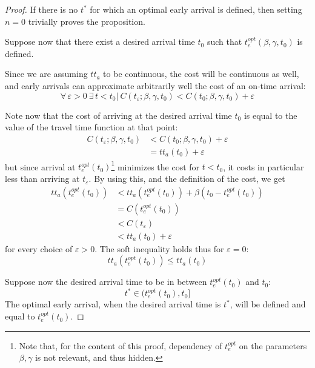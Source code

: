 \begin{proof}
  If there is no \(t^*\) for which an optimal early arrival is defined,
  then setting \(n = 0\) trivially proves the proposition.

  Suppose now that there exist a desired arrival time \(t_0\) such that \(t_e^{opt}(\beta, \gamma, t_0)\) is defined.

  Since we are assuming \(tt_a\) to be continuous,
  the cost will be continuous as well,
  and early arrivals can approximate arbitrarily well the cost of an on-time arrival:
  \begin{equation*}
    \forall\, \varepsilon > 0\ \exists\, t < t_0 |\ C(t_\varepsilon; \beta, \gamma, t_0) < C(t_0; \beta, \gamma, t_0) + \varepsilon
  \end{equation*}

  Note now that the cost of arriving at the desired arrival time \(t_0\) is equal to the value of the travel time function at that point:
  \begin{align*}
     C(t_\varepsilon; \beta, \gamma, t_0) & < C(t_0; \beta, \gamma, t_0) + \varepsilon \\
                              & = tt_a(t_0) + \varepsilon
  \end{align*}
  but since arrival at \(t_e^{opt}(t_0)\)\footnote{Note that, for the content of this proof, dependency of \(t_e^{opt}\) on the parameters \(\beta, \gamma\) is not relevant, and thus hidden.} minimizes the cost for \(t < t_0\),
  it costs in particular less than arriving at \(t_\varepsilon\).
  By using this, and the definition of the cost, we get
  \begin{align*}
    tt_a(t_e^{opt}(t_0)) & < tt_a(t_e^{opt}(t_0)) + \beta(t_0 - t_e^{opt}(t_0)) \\
                                        & = C(t_e^{opt}(t_0)) \\
                                        & < C(t_\varepsilon) \\
                                        & < tt_a(t_0) + \varepsilon
  \end{align*}
  for every choice of \(\varepsilon > 0\).
  The soft inequality holds thus for \(\varepsilon = 0\):
  \begin{equation*}
    tt_a(t_e^{opt}(t_0)) \leq tt_a(t_0)
  \end{equation*}

  Suppose now the desired arrival time to be in between \(t_e^{opt}(t_0)\) and \(t_0\):
  \begin{equation*}
    t^* \in (t_e^{opt}(t_0), t_0]
  \end{equation*}
  The optimal early arrival, when the desired arrival time is \(t^*\),
  will be defined and equal to \(t_e^{opt}(t_0)\).
  

\end{proof}
